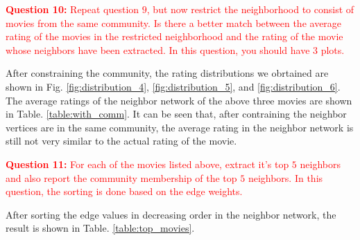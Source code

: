 \documentclass[11pt]{article}
\begin{document}
\textcolor{red}{\textbf{Question 10:} Repeat question $9$, but now restrict the neighborhood to consist of movies from the same community. Is there a better match between the average rating of the movies in the restricted neighborhood and the rating of the movie whose neighbors have been extracted. In this question, you should have $3$ plots.}

After constraining the community, the rating distributions we obrtained are shown in Fig. \ref{fig:distribution_4}, \ref{fig:distribution_5}, and \ref{fig:distribution_6}. The average ratings of the neighbor network of the above three movies are shown in Table. \ref{table:with_comm}. It can be seen that, after contraining the neighbor vertices are in the same community, the average rating in the neighbor network is still not very similar to the actual rating of the movie.

\begin{table}[H]
\center
\caption{Average rating vs. actual rating of the three movies, with community considered}
\label{table:with_comm}
\end{table}

\textcolor{red}{\textbf{Question 11:} For each of the movies listed above, extract it's top $5$ neighbors and also report the community membership of the top $5$ neighbors. In this question, the sorting is done based on the edge weights.}

After sorting the edge values in decreasing order in the neighbor network, the result is shown in Table. \ref{table:top_movies}.
\end{document}
